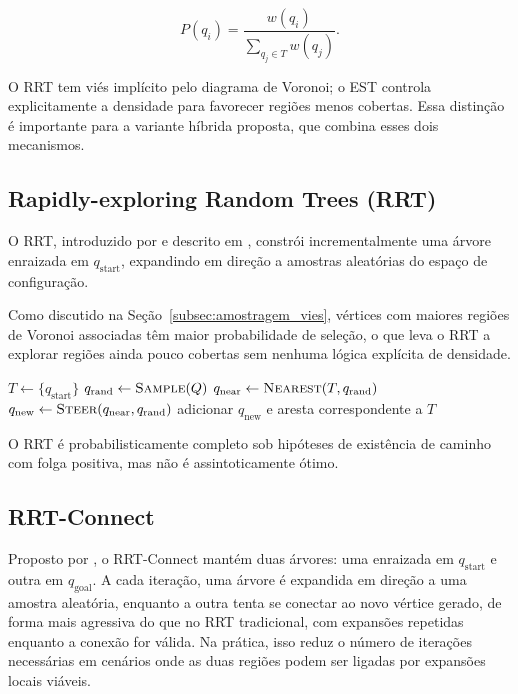 \begin{equation}
P(q_i) =
\frac{w(q_i)}
{\sum_{q_j \in T} w(q_j)}.
\label{eq:est_probability}
\end{equation}

O RRT tem viés implícito pelo diagrama de Voronoi; o EST controla explicitamente a densidade para favorecer regiões menos cobertas. Essa distinção é importante para a variante híbrida proposta, que combina esses dois mecanismos.

\subsection{Rapidly-exploring Random Trees (RRT)}
\label{subsec:rrt}

O RRT, introduzido por \citet{lavalle1998rapidly} e descrito em \citet{choset2005principles}, constrói incrementalmente uma árvore enraizada em $q_{\mathrm{start}}$, expandindo em direção a amostras aleatórias do espaço de configuração.

Como discutido na Seção~\ref{subsec:amostragem_vies}, vértices com maiores regiões de Voronoi associadas têm maior probabilidade de seleção, o que leva o RRT a explorar regiões ainda pouco cobertas sem nenhuma lógica explícita de densidade.

\begin{algorithm}[H]
\caption{RRT}
\begin{algorithmic}[1]
\State $T \gets \{q_{\mathrm{start}}\}$
    \State $q_{\mathrm{rand}} \gets \textsc{Sample}(Q)$
    \State $q_{\mathrm{near}} \gets \textsc{Nearest}(T, q_{\mathrm{rand}})$
    \State $q_{\mathrm{new}} \gets \textsc{Steer}(q_{\mathrm{near}}, q_{\mathrm{rand}})$
        \State adicionar $q_{\mathrm{new}}$ e aresta correspondente a $T$
    \EndIf
\EndWhile
\end{algorithmic}
\end{algorithm}

O RRT é probabilisticamente completo sob hipóteses de existência de caminho com folga positiva, mas não é assintoticamente ótimo.

\subsection{RRT-Connect}

Proposto por \citet{kuffner2000rrtconnect}, o RRT-Connect mantém duas árvores: uma enraizada em $q_{\mathrm{start}}$ e outra em $q_{\mathrm{goal}}$. A cada iteração, uma árvore é expandida em direção a uma amostra aleatória, enquanto a outra tenta se conectar ao novo vértice gerado, de forma mais agressiva do que no RRT tradicional, com expansões repetidas enquanto a conexão for válida. Na prática, isso reduz o número de iterações necessárias em cenários onde as duas regiões podem ser ligadas por expansões locais viáveis.

